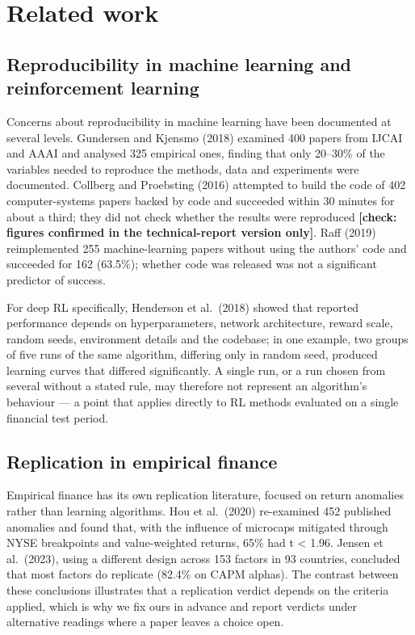 \documentclass[12pt,a4paper]{report}
\begin{document}
\chapter{Related work}\label{chapter-2.-related-work}

\section{Reproducibility in machine learning and reinforcement
learning}\label{reproducibility-in-machine-learning-and-reinforcement-learning}

Concerns about reproducibility in machine learning have been documented
at several levels. Gundersen and Kjensmo (2018) examined 400 papers from
IJCAI and AAAI and analysed 325 empirical ones, finding that only
20--30\% of the variables needed to reproduce the methods, data and
experiments were documented. Collberg and Proebsting (2016) attempted to
build the code of 402 computer-systems papers backed by code and
succeeded within 30 minutes for about a third; they did not check
whether the results were reproduced \textbf{{[}check: figures confirmed
in the technical-report version only{]}}. Raff (2019) reimplemented 255
machine-learning papers without using the authors' code and succeeded
for 162 (63.5\%); whether code was released was not a significant
predictor of success.

For deep RL specifically, Henderson et al.~(2018) showed that reported
performance depends on hyperparameters, network architecture, reward
scale, random seeds, environment details and the codebase; in one
example, two groups of five runs of the same algorithm, differing only
in random seed, produced learning curves that differed significantly. A
single run, or a run chosen from several without a stated rule, may
therefore not represent an algorithm's behaviour --- a point that
applies directly to RL methods evaluated on a single financial test
period.

\section{Replication in empirical
finance}\label{replication-in-empirical-finance}

Empirical finance has its own replication literature, focused on return
anomalies rather than learning algorithms. Hou et al.~(2020) re-examined
452 published anomalies and found that, with the influence of microcaps
mitigated through NYSE breakpoints and value-weighted returns, 65\% had
\textbar t\textbar{} \textless{} 1.96. Jensen et al.~(2023), using a
different design across 153 factors in 93 countries, concluded that most
factors do replicate (82.4\% on CAPM alphas). The contrast between these
conclusions illustrates that a replication verdict depends on the
criteria applied, which is why we fix ours in advance and report
verdicts under alternative readings where a paper leaves a choice open.
\end{document}
